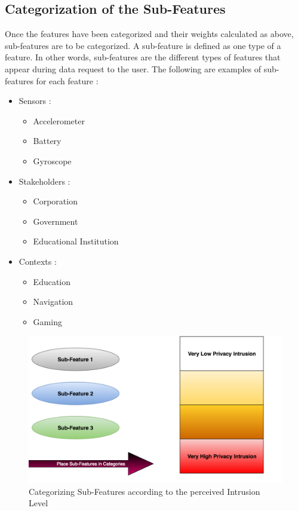 \subsection{Categorization of the Sub-Features}
Once the features have been categorized and their weights calculated as above, sub-features are to be categorized. A sub-feature
is defined as one type of a feature. In other words, sub-features are the different types of features that appear during data request to the user. The following are examples of sub-features for each feature :

\begin{itemize}
\item Sensors : 
\begin{itemize}
\item Accelerometer
\item  Battery
\item Gyroscope
\end{itemize} 
\item Stakeholders : 
\begin{itemize}
\item Corporation
\item  Government
\item Educational Institution
\end{itemize}
\item Contexts :
\begin{itemize}
\item Education
\item Navigation
\item Gaming
\end{itemize}
\end{itemize}

\begin{figure}[ht!]
\centering
\includegraphics[width=\textwidth,keepaspectratio]{./images/categorize_sub}
\caption{Categorizing Sub-Features according to the perceived Intrusion Level \label{categorize_sub}}
\end{figure}

